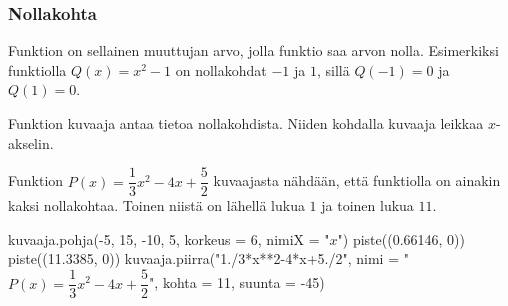 \subsubsection*{Nollakohta}

Funktion  on sellainen muuttujan arvo, jolla funktio saa arvon nolla. Esimerkiksi funktiolla $Q(x)=x^2-1$
on nollakohdat $-1$ ja $1$, sillä $Q(-1)=0$ ja $Q(1)=0$.

Funktion kuvaaja antaa tietoa nollakohdista. Niiden kohdalla kuvaaja leikkaa $x$-akselin.

\begin{esimerkki}
Funktion $P(x) = \dfrac{1}{3}x^2-4x+\dfrac{5}{2}$ kuvaajasta nähdään, että funktiolla on ainakin kaksi nollakohtaa. Toinen niistä on lähellä lukua $1$ ja toinen lukua $11$.

\begin{kuva}
kuvaaja.pohja(-5, 15, -10, 5, korkeus = 6, nimiX = "$x$")
piste((0.66146, 0))
piste((11.3385, 0))
kuvaaja.piirra("1./3*x**2-4*x+5./2", nimi = "$P(x) = \dfrac{1}{3}x^2-4x+\dfrac{5}{2}$", kohta = 11, suunta = -45)
\end{kuva}
\end{esimerkki}



